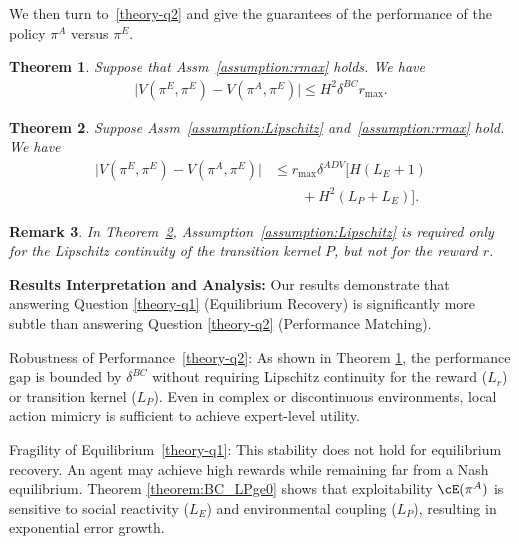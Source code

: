 \documentclass{article}
\theoremstyle{plain}
\newtheorem{theorem}{Theorem}[section]
\newtheorem{remark}[theorem]{Remark}
\begin{document}
We then turn to~\ref{theory-q2} and give the guarantees of the performance of the policy $\pi^A$ versus $\pi^E$.
\begin{theorem}
    \label{theorem:BC_LPge0_reward}
    Suppose that Assm~\ref{assumption:rmax} holds. We have
    \begin{equation}
        \begin{split}
            \vert V(\pi^E, \pi^E) - V(\pi^A, \pi^E) \vert \leq H^2 \delta^{BC} r_{\max}.
        \end{split}
    \end{equation}
\end{theorem}

\begin{theorem}
    \label{theorem:ADV_LPge0_reward}
    Suppose Assm~\ref{assumption:Lipschitz} and~\ref{assumption:rmax} hold. We have
    \begin{equation}
        \begin{split}
            \vert V(\pi^E, \pi^E) - V(\pi^A, \pi^E) \vert 
            &\leq r_{\max}\delta^{ADV}\Big[H(L_E +1) 
            \\
            &\qquad + H^2 (L_P + L_E)\Big].
        \end{split}
    \end{equation}
\end{theorem}

\begin{remark}
    In Theorem~\ref{theorem:ADV_LPge0_reward}, Assumption~\ref{assumption:Lipschitz} is required only for the Lipschitz continuity of the transition kernel $P$, but not for the reward $r$. 
\end{remark}
\noindent\textbf{Results Interpretation and Analysis:}
Our results demonstrate that answering Question \ref{theory-q1} (Equilibrium Recovery) is significantly more subtle than answering Question \ref{theory-q2} (Performance Matching). 

Robustness of Performance~\ref{theory-q2}: As shown in Theorem \ref{theorem:BC_LPge0_reward}, the performance gap is bounded by $\delta^{BC}$ without requiring Lipschitz continuity for the reward ($L_r$) or transition kernel ($L_P$). Even in complex or discontinuous environments, local action mimicry is sufficient to achieve expert-level utility.

Fragility of Equilibrium~\ref{theory-q1}: This stability does not hold for equilibrium recovery. An agent may achieve high rewards while remaining far from a Nash equilibrium. Theorem \ref{theorem:BC_LPge0} shows that exploitability $\cE(\pi^A)$ is sensitive to social reactivity ($L_E$) and environmental coupling ($L_P$), resulting in exponential error growth.
\end{document}

